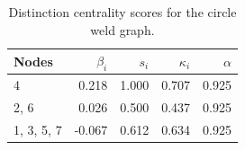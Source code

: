 \begin{table}
\centering
\caption{\label{tab:cw}Distinction centrality scores for the circle weld graph.}
\centering
\begin{tabular}[t]{lrrrr}
\toprule
Nodes & $\beta_i$ & $s_i$ & $\kappa_i$ & $\alpha$\\
\midrule
4 & 0.218 & 1.000 & 0.707 & 0.925\\
2, 6 & 0.026 & 0.500 & 0.437 & 0.925\\
1, 3, 5, 7 & -0.067 & 0.612 & 0.634 & 0.925\\
\bottomrule
\end{tabular}
\end{table}
